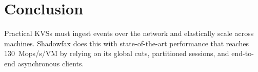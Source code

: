 \section{Conclusion}
\label{sec:conclude}

Practical KVSs must ingest events over the network and elastically scale across machines.
%
Shadowfax does this with state-of-the-art performance that
reaches 130~Mops/s/VM by relying on its global cuts, partitioned
sessions, and end-to-end asynchronous clients.

